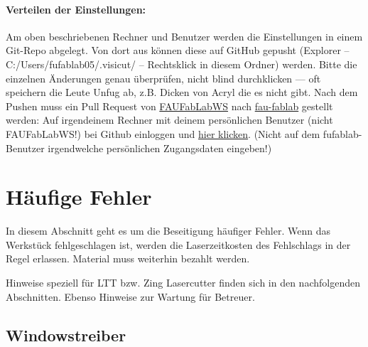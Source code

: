 \documentclass{\basedir/fablab-document}
\begin{document}
	\paragraph{Verteilen der Einstellungen:}
	Am oben beschriebenen Rechner und Benutzer werden die Einstellungen in einem Git-Repo abgelegt.
	Von dort aus können diese auf GitHub gepusht (Explorer -- C:/Users/fufablab05/.visicut/ -- Rechtsklick in diesem Ordner) werden. Bitte die einzelnen Änderungen genau überprüfen, nicht blind durchklicken --- oft speichern die Leute Unfug ab, z.B. Dicken von Acryl die es nicht gibt. Nach dem Pushen muss ein Pull Request von \href{https://github.com/FAUFabLabWS/visicut-settings}{FAUFabLabWS} nach \href{https://github.com/fau-fablab/visicut-settings}{fau-fablab} gestellt werden: Auf irgendeinem Rechner mit deinem persönlichen Benutzer (nicht FAUFabLabWS!) bei Github einloggen und \href{https://github.com/fau-fablab/visicut-settings/compare/master...FAUFabLabWS:master}{hier klicken}. (Nicht auf dem fufablab-Benutzer irgendwelche persönlichen Zugangsdaten eingeben!)

	\section{Häufige Fehler}
	\label{sec:fehler-allgemein}
	In diesem Abschnitt geht es um die Beseitigung häufiger Fehler. Wenn das Werkstück fehlgeschlagen ist, werden die Laserzeitkosten des Fehlschlags in der Regel erlassen. Material muss weiterhin bezahlt werden.

	Hinweise speziell für LTT bzw. Zing Lasercutter finden sich in den nachfolgenden Abschnitten. Ebenso Hinweise zur Wartung für Betreuer.

	\subsection{Windowstreiber}
\end{document}
